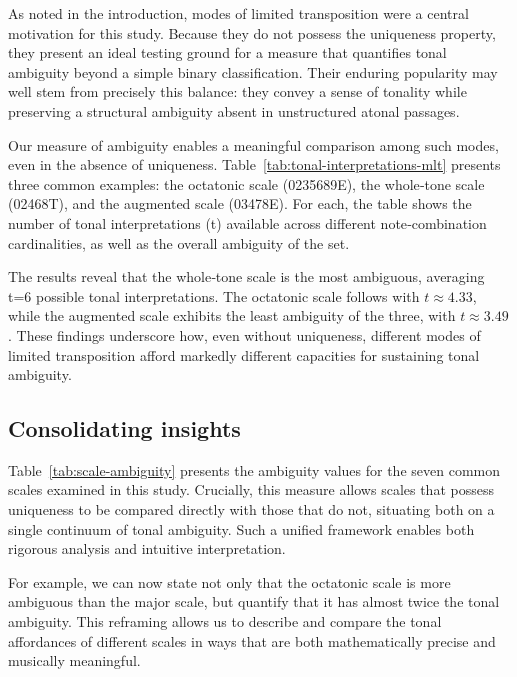 \documentclass[10pt,twocolumn]{article}
\numberwithin{equation}{section} %
\begin{document}
    As noted in the introduction, modes of limited transposition were a central motivation for this study.
    Because they do not possess the uniqueness property, they present an ideal testing ground for a measure that quantifies tonal ambiguity beyond a simple binary classification.
    Their enduring popularity may well stem from precisely this balance: they convey a sense of tonality while preserving a structural ambiguity absent in unstructured atonal passages.

    Our measure of ambiguity enables a meaningful comparison among such modes, even in the absence of uniqueness.
    Table~\ref{tab:tonal-interpretations-mlt} presents three common examples: the octatonic scale (0235689E), the whole‑tone scale (02468T), and the augmented scale (03478E).
    For each, the table shows the number of tonal interpretations (t) available across different note‑combination cardinalities, as well as the overall ambiguity of the set.

    The results reveal that the whole‑tone scale is the most ambiguous, averaging t=6 possible tonal interpretations.
    The octatonic scale follows with $t \approx 4.33$, while the augmented scale exhibits the least ambiguity of the three, with $t \approx 3.49$.
    These findings underscore how, even without uniqueness, different modes of limited transposition afford markedly different capacities for sustaining tonal ambiguity.

    

    \subsection{Consolidating insights}

    Table~\ref{tab:scale-ambiguity} presents the ambiguity values for the seven common scales examined in this study.
    Crucially, this measure allows scales that possess uniqueness to be compared directly with those that do not, situating both on a single continuum of tonal ambiguity.
    Such a unified framework enables both rigorous analysis and intuitive interpretation.

    For example, we can now state not only that the octatonic scale is more ambiguous than the major scale, but quantify that it has almost twice the tonal ambiguity.
    This reframing allows us to describe and compare the tonal affordances of different
    scales in ways that are both mathematically precise and musically meaningful.
\end{document}
